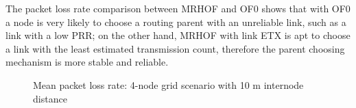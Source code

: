 The packet loss rate comparison between MRHOF and OF0 shows that with OF0 a node is very likely to choose a routing parent with an unreliable link, such as a link with a low PRR; on the other hand, MRHOF with link ETX is apt to choose a link with the least estimated transmission count, therefore the parent choosing mechanism is more stable and reliable. 

\begin{figure}[p]
  \centering
    \leavevmode
   \caption{Mean packet loss rate: 4-node grid scenario with 10 m internode distance}
   \label{fig:pl_4_grid_10}
    \vspace{-20pt}
\end{figure}

